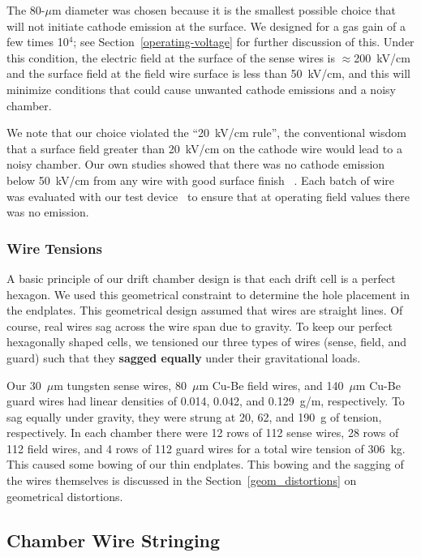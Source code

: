 The 80-$\mu$m diameter was chosen because it is the smallest possible choice
that will not initiate cathode emission at the surface.
We designed for a  gas gain of a few times 
10$^4$; see Section~\ref{operating-voltage} for further discussion of this. 
Under this condition, the electric field at the surface of the sense 
wires is $\approx$200~kV/cm and the surface field at the field wire
surface is less than 50~kV/cm, and this will minimize 
conditions that could cause unwanted cathode emissions and a noisy chamber.  

We note that our choice violated the ``20~kV/cm rule'', the conventional wisdom that
a surface field greater than 20~kV/cm on the cathode wire would lead to 
a noisy chamber. Our own studies showed that there was no cathode emission below
50~kV/cm from any wire with good surface finish~\cite{cathode-emission} .  Each batch
of wire was evaluated with our test device~\cite{patent} to ensure that at operating field 
values there was no emission.  

\subsubsection{Wire Tensions}

A basic principle of our drift chamber design is that each drift cell is a perfect hexagon.
We used this geometrical constraint to determine the hole placement in the endplates.
This geometrical design assumed that wires are straight lines.  Of course, real wires
sag across the wire span due to gravity.  To keep our perfect hexagonally shaped cells,
we tensioned our three types of wires (sense, field, and guard) such that they
{\bf sagged equally} under their gravitational loads.

Our 30~$\mu$m tungsten sense wires, 80~$\mu$m Cu-Be field wires, and 140~$\mu$m Cu-Be guard
wires had linear densities of 0.014, 0.042, and 0.129~g/m, respectively.  To sag equally
under gravity, they were strung at 20, 62, and 190~g of tension, respectively.
In each chamber there were 12 rows of 112 sense wires, 28 rows of 112 field wires,
and 4 rows of 112 guard wires for a total wire tension of 306~kg.
This caused some bowing of our thin endplates. This bowing and the sagging
of the wires themselves is discussed in the Section~\ref{geom_distortions} on geometrical distortions.

\subsection{Chamber Wire Stringing}


